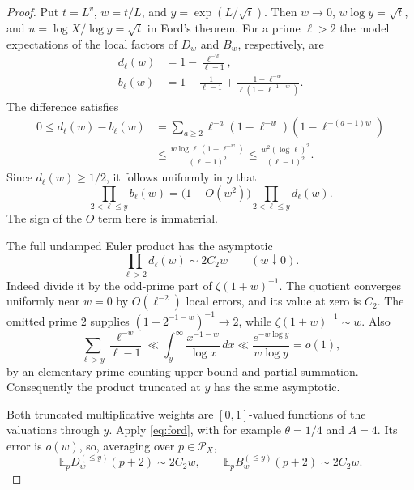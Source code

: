 \documentclass[11pt]{article}
\theoremstyle{remark}
\newcommand{\E}{\mathbb E}
\begin{document}
\begin{proof}
Put $t=L^v$, $w=t/L$, and $y=\exp(L/\sqrt t)$.
Then $w\to0$, $w\log y=\sqrt t$, and
$u=\log X/\log y=\sqrt t$ in Ford's theorem.
For a prime $\ell>2$ the model expectations of the local factors of
$D_w$ and $B_w$, respectively, are
\begin{align}
 d_\ell(w)&=1-\frac{\ell^{-w}}{\ell-1},\label{eq:local-d}\\
 b_\ell(w)&=1-\frac1{\ell-1}
       +\frac{1-\ell^{-w}}{\ell(1-\ell^{-1-w})}.
       \label{eq:local-b}
\end{align}
The difference satisfies
\begin{align*}
 0\le d_\ell(w)-b_\ell(w)
 &=\sum_{a\ge2}\ell^{-a}(1-\ell^{-w})
                         (1-\ell^{-(a-1)w})\\
 &\le\frac{w\log\ell\,(1-\ell^{-w})}{(\ell-1)^2}
 \le\frac{w^2(\log\ell)^2}{(\ell-1)^2}.
\end{align*}
Since $d_\ell(w)\ge1/2$, it follows uniformly in $y$ that
\begin{equation}\label{eq:model-powers}
       \prod_{2<\ell\le y}b_\ell(w)
          =\bigl(1+O(w^2)\bigr)\prod_{2<\ell\le y}d_\ell(w).
\end{equation}
The sign of the $O$ term here is immaterial.

The full undamped Euler product has the asymptotic
\begin{equation}\label{eq:euler-main}
 \prod_{\ell>2}d_\ell(w)\sim2C_2w\qquad(w\downarrow0).
\end{equation}
Indeed divide it by the odd-prime part of $\zeta(1+w)^{-1}$.
The quotient converges uniformly near $w=0$ by $O(\ell^{-2})$ local
errors, and its value at zero is $C_2$. The omitted prime $2$ supplies
$(1-2^{-1-w})^{-1}\to2$, while $\zeta(1+w)^{-1}\sim w$.
Also
\[
 \sum_{\ell>y}\frac{\ell^{-w}}{\ell-1}
 \ll\int_y^\infty\frac{x^{-1-w}}{\log x}\,dx
 \ll\frac{e^{-w\log y}}{w\log y}=o(1),
\]
by an elementary prime-counting upper bound and partial summation.
Consequently the product truncated at $y$ has the same asymptotic.

Both truncated multiplicative weights are $[0,1]$-valued functions of
the valuations through $y$. Apply \eqref{eq:ford}, with for example
$\theta=1/4$ and $A=4$. Its error is $o(w)$, so, averaging over
$p\in\mathcal P_X$,
\begin{equation}\label{eq:truncated-mean}
 \E_p D_w^{(\le y)}(p+2)\sim2C_2w,
 \qquad
 \E_p B_w^{(\le y)}(p+2)\sim2C_2w.
\end{equation}


\end{proof}
\end{document}
